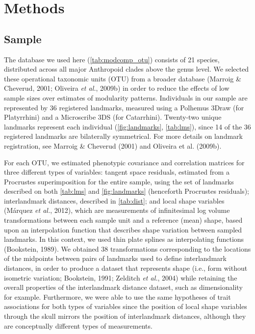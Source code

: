 \documentclass[12pt,twoside]{report}
\begin{document}
\section{Methods}\label{methods}

\subsection{Sample}\label{sample}

The database we used here (\autoref{tab:modcomp_otu}) consists of 21
species, distributed across all major Anthropoid clades above the genus
level. We selected these operational taxonomic units (OTU) from a
broader database (Marroig \& Cheverud, 2001; Oliveira \emph{et al.},
2009b) in order to reduce the effects of low sample sizes over estimates
of modularity patterns. Individuals in our sample are represented by 36
registered landmarks, measured using a Polhemus 3Draw (for Platyrrhini)
and a Microscribe 3DS (for Catarrhini). Twenty-two unique landmarks
represent each individual (\autoref{fig:landmarks}, \autoref{tab:lms}),
since 14 of the 36 registered landmarks are bilaterally symmetrical. For
more details on landmark registration, see Marroig \& Cheverud (2001)
and Oliveira et al. (2009b).



For each OTU, we estimated phenotypic covariance and correlation
matrices for three different types of variables: tangent space
residuals, estimated from a Procrustes superimposition for the entire
sample, using the set of landmarks described on both \autoref{tab:lms}
and \autoref{fig:landmarks} (henceforth Procrustes residuals);
interlandmark distances, described in \autoref{tab:dist}; and local
shape variables (Márquez \emph{et al.}, 2012), which are measurements of
infinitesimal log volume transformations between each sample unit and a
reference (mean) shape, based upon an interpolation function that
describes shape variation between sampled landmarks. In this context, we
used thin plate splines as interpolating functions (Bookstein, 1989). We
obtained 38 transformations corresponding to the locations of the
midpoints between pairs of landmarks used to define interlandmark
distances, in order to produce a dataset that represents shape (i.e.,
form without isometric variation; Bookstein, 1991; Zelditch \emph{et
al.}, 2004) while retaining the overall properties of the interlandmark
distance dataset, such as dimensionality for example. Furthermore, we
were able to use the same hypotheses of trait associations for both
types of variables since the position of local shape variables through
the skull mirrors the position of interlandmark distances, although they
are conceptually different types of measurements.
\end{document}
